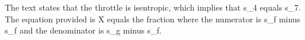 The text states that the throttle is isentropic, which implies that s_4 equals s_7. The equation provided is X equals the fraction where the numerator is s_f minus s_f and the denominator is s_g minus s_f.